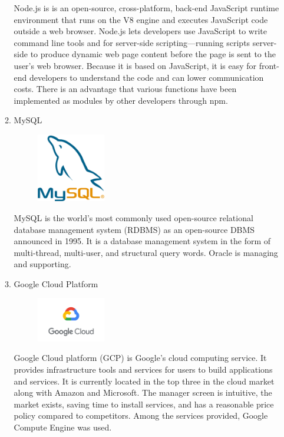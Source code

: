 \documentclass[conference]{IEEEtran}
\begin{document}
\begin{itemize}
\begin{enumerate}
Node.js is is an open-source, cross-platform, back-end JavaScript runtime environment that runs on the V8 engine and executes JavaScript code outside a web browser. Node.js lets developers use JavaScript to write command line tools and for server-side scripting—running scripts server-side to produce dynamic web page content before the page is sent to the user's web browser. Because it is based on JavaScript, it is easy for front-end developers to understand the code and can lower communication costs. There is an advantage that various functions have been implemented as modules by other developers through npm.

\item MySQL
\par \begin{figure}[h!]
\includegraphics[width=3cm]{image/MySQL.png}
\centering
\end{figure}

MySQL is the world's most commonly used open-source relational database management system (RDBMS) as an open-source DBMS announced in 1995. It is a database management system in the form of multi-thread, multi-user, and structural query words. Oracle is managing and supporting.

\item Google Cloud Platform
\par \begin{figure}[h!]
\includegraphics[width=3cm]{image/GCP.png}
\centering
\end{figure}

Google Cloud platform (GCP) is Google's cloud computing service. It provides infrastructure tools and services for users to build applications and services. It is currently located in the top three in the cloud market along with Amazon and Microsoft. The manager screen is intuitive, the market exists, saving time to install services, and has a reasonable price policy compared to competitors. Among the services provided, Google Compute Engine was used.


\end{enumerate}
\end{itemize}
\end{document}
